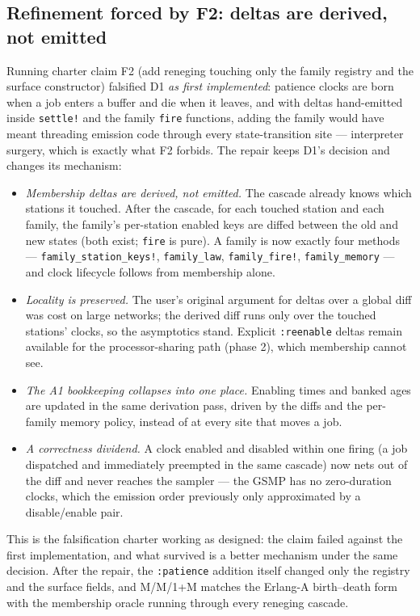 \documentclass[11pt]{article}
\newcommand{\code}[1]{\texttt{#1}}
\begin{document}
\subsection{Refinement forced by F2: deltas are derived, not emitted}
\label{sec:derived}

Running charter claim F2 (add reneging touching only the family registry and
the surface constructor) falsified D1 \emph{as first implemented}: patience
clocks are born when a job enters a buffer and die when it leaves, and with
deltas hand-emitted inside \code{settle!} and the family \code{fire}
functions, adding the family would have meant threading emission code
through every state-transition site — interpreter surgery, which is exactly
what F2 forbids. The repair keeps D1's decision and changes its mechanism:

\begin{itemize}
\item \emph{Membership deltas are derived, not emitted.} The cascade already
  knows which stations it touched. After the cascade, for each touched
  station and each family, the family's per-station enabled keys are diffed
  between the old and new states (both exist; \code{fire} is pure). A family
  is now exactly four methods — \code{family\_station\_keys!},
  \code{family\_law}, \code{family\_fire!}, \code{family\_memory} — and
  clock lifecycle follows from membership alone.
\item \emph{Locality is preserved.} The user's original argument for deltas
  over a global diff was cost on large networks; the derived diff runs only
  over the touched stations' clocks, so the asymptotics stand. Explicit
  \code{:reenable} deltas remain available for the processor-sharing path
  (phase 2), which membership cannot see.
\item \emph{The A1 bookkeeping collapses into one place.} Enabling times and
  banked ages are updated in the same derivation pass, driven by the diffs
  and the per-family memory policy, instead of at every site that moves a
  job.
\item \emph{A correctness dividend.} A clock enabled and disabled within one
  firing (a job dispatched and immediately preempted in the same cascade)
  now nets out of the diff and never reaches the sampler — the GSMP has no
  zero-duration clocks, which the emission order previously only
  approximated by a disable/enable pair.
\end{itemize}

This is the falsification charter working as designed: the claim failed
against the first implementation, and what survived is a better mechanism
under the same decision. After the repair, the \code{:patience} addition
itself changed only the registry and the surface fields, and M/M/1+M
matches the Erlang-A birth--death form with the membership oracle running
through every reneging cascade.
\end{document}
